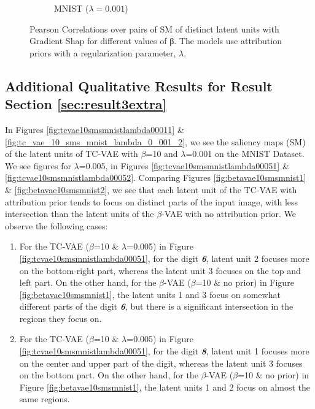 \begin{figure}[h]
\begin{subfigure}[b]{0.32\linewidth}
\caption{MNIST ($\lambda= 0.001$)}\label{fig:metric_box_plots_mnist_0_001}
\end{subfigure}
\caption{Pearson Correlations over pairs of SM of distinct latent units with Gradient Shap for different values of β. The models use attribution priors with a regularization parameter, $\lambda$.}\label{fig:attrpriorsboxplts}
\end{figure}

\subsection{Additional Qualitative Results for Result Section \ref{sec:result3extra}}\label{app:qualresult3extra}
In Figures \ref{fig:tcvae10smsmnistlambda00011} \& \ref{fig:tc_vae_10_sms_mnist_lambda_0_001_2}, we see the saliency maps (SM) of the latent units of TC‐VAE with $\beta$=10 and $\lambda$=0.001 on the MNIST Dataset. We see figures for $\lambda$=0.005, in Figures \ref{fig:tcvae10smsmnistlambda00051} \& \ref{fig:tcvae10smsmnistlambda00052}. Comparing 
 Figures \ref{fig:betavae10smsmnist1} \& \ref{fig:betavae10smsmnist2}, we see that each latent unit of the TC‐VAE with attribution prior tends to focus on distinct parts of the input image, with less intersection than the latent units of the $\beta$-VAE with no attribution prior. We observe the following cases:
\begin{enumerate}[labelindent=\parindent,leftmargin=*, topsep=0pt]
    \itemsep0em
    \item\label{qualprior:obs1} For the TC‐VAE ($\beta$=10  \& $\lambda$=0.005) in Figure \ref{fig:tcvae10smsmnistlambda00051}, for the digit \textbf{\textit{6}}, latent unit 2 focuses more on the bottom-right part, whereas the latent unit 3 focuses on the top and left part. On the other hand, for the $\beta$-VAE ($\beta$=10 \& no prior) in Figure \ref{fig:betavae10smsmnist1}, the latent units 1 and 3 focus on somewhat different parts of the digit \textbf{\textit{6}}, but there is a significant intersection in the regions they focus on. 
    \item \label{qualprior:obs2}  For the TC‐VAE ($\beta$=10  \& $\lambda$=0.005) in Figure \ref{fig:tcvae10smsmnistlambda00051}, for the digit \textbf{\textit{8}}, latent unit 1 focuses more on the center and upper part of the digit, whereas the latent unit 3 focuses on the bottom part. On the other hand, for the $\beta$-VAE ($\beta$=10 \& no prior) in Figure \ref{fig:betavae10smsmnist1}, the latent units 1 and 2 focus on almost the same regions. 
\end{enumerate}

